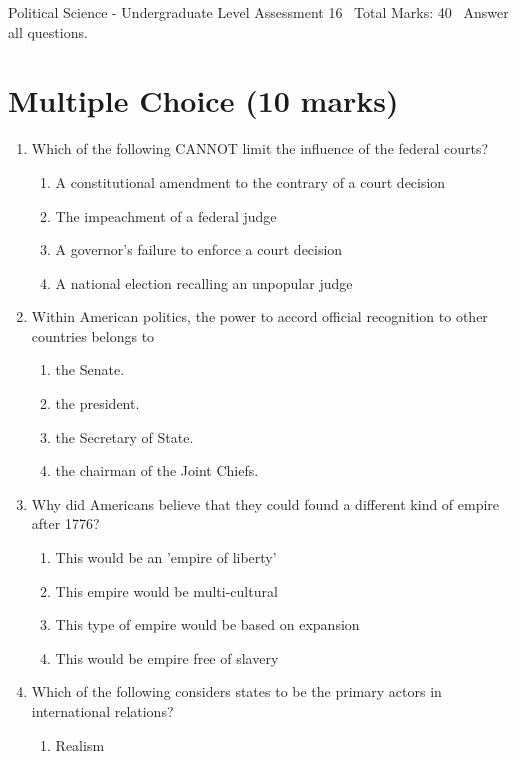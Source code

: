 \documentclass[12pt]{article}
\begin{document}
\begin{center}
Political Science - Undergraduate Level Assessment 16 \
Total Marks: 40 \
Answer all questions.
\end{center}

\section*{Multiple Choice (10 marks)}
\begin{enumerate}[label=\arabic*.]
\item Which of the following CANNOT limit the influence of the federal courts?
\begin{enumerate}[label=(\alph*)]
    \item A constitutional amendment to the contrary of a court decision
    \item The impeachment of a federal judge
    \item A governor's failure to enforce a court decision
    \item A national election recalling an unpopular judge
\end{enumerate}
\item Within American politics, the power to accord official recognition to other countries belongs to
\begin{enumerate}[label=(\alph*)]
    \item the Senate.
    \item the president.
    \item the Secretary of State.
    \item the chairman of the Joint Chiefs.
\end{enumerate}
\item Why did Americans believe that they could found a different kind of empire after 1776?
\begin{enumerate}[label=(\alph*)]
    \item This would be an 'empire of liberty'
    \item This empire would be multi-cultural
    \item This type of empire would be based on expansion
    \item This would be empire free of slavery
\end{enumerate}
\item Which of the following considers states to be the primary actors in international relations?
\begin{enumerate}[label=(\alph*)]
    \item Realism

\end{enumerate}
\end{enumerate}
\end{document}
